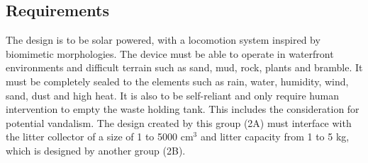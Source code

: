 \subsection{Requirements}

The design is to be solar powered, with a locomotion system inspired by biomimetic morphologies. The device must be able to operate in waterfront environments and difficult terrain such as sand, mud, rock, plants and bramble. It must be completely sealed to the elements such as rain, water, humidity, wind, sand, dust and high heat. It is also to be self-reliant and only require human intervention to empty the waste holding tank. This includes the consideration for potential vandalism. The design created by this group (2A) must interface with the litter collector of a size of 1 to 5000 cm$^3$ and litter capacity from 1 to 5 kg, which is designed by another group (2B).

